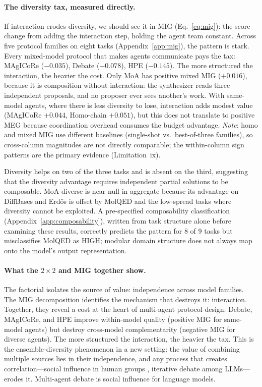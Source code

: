 \documentclass{article}
\begin{document}
\paragraph{The diversity tax, measured directly.}
If interaction erodes diversity, we should see it in MIG (Eq.~\ref{eq:mig}): the score change from adding the interaction step, holding the agent team constant. Across five protocol families on eight tasks (Appendix~\ref{app:mig}), the pattern is stark. Every mixed-model protocol that makes agents communicate pays the tax: MAgICoRe ($-0.035$), Debate ($-0.078$), HPE ($-0.145$). The more structured the interaction, the heavier the cost. Only MoA has positive mixed MIG ($+0.016$), because it is composition without interaction: the synthesizer reads three independent proposals, and no proposer ever sees another's work. With same-model agents, where there is less diversity to lose, interaction adds modest value (MAgICoRe $+0.044$, Homo-chain $+0.051$), but this does not translate to positive MEG because coordination overhead consumes the budget advantage. \emph{Note}: homo and mixed MIG use different baselines (single-shot vs.\ best-of-three families), so cross-column magnitudes are not directly comparable; the within-column sign patterns are the primary evidence (Limitation~ix).

Diversity helps on two of the three tasks and is absent on the third, suggesting that the diversity advantage requires independent partial solutions to be composable. MoA-diverse is near null in aggregate because its advantage on DiffBases and Erd\H{o}s is offset by MolQED and the low-spread tasks where diversity cannot be exploited. A pre-specified composability classification (Appendix~\ref{app:composability}), written from task structure alone before examining these results, correctly predicts the pattern for 8 of 9 tasks but misclassifies MolQED as HIGH; modular domain structure does not always map onto the model's output representation.

\paragraph{What the $2{\times}2$ and MIG together show.}
The factorial isolates the source of value: independence across model families. The MIG decomposition identifies the mechanism that destroys it: interaction. Together, they reveal a cost at the heart of multi-agent protocol design. Debate, MAgICoRe, and HPE improve within-model quality (positive MIG for same-model agents) but destroy cross-model complementarity (negative MIG for diverse agents). The more structured the interaction, the heavier the tax. This is the ensemble-diversity phenomenon in a new setting: the value of combining multiple sources lies in their independence, and any process that creates correlation---social influence in human groups \citep{lorenz2011social}, iterative debate among LLMs---erodes it. Multi-agent debate is social influence for language models.
\end{document}
